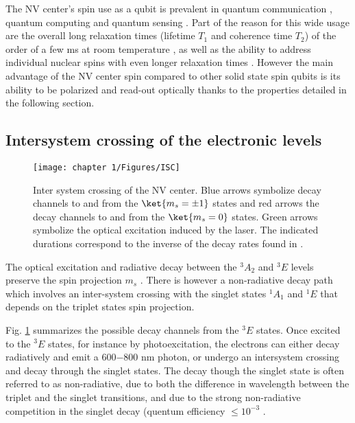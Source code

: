 \documentclass[a4paper, 11pt]{report}
\begin{document}
\bigskip
The NV center's spin use as a qubit is prevalent in quantum communication \citep{wehner2018quantum}, quantum computing \citep{de2021materials} and quantum sensing \citep{degen2017quantum}. Part of the reason for this wide usage are the overall long relaxation times (lifetime $T_1$ and coherence time $T_2$) of the order of a few ms at room temperature \citep{balasubramanian2009ultralong}, as well as the ability to address individual nuclear spins with even longer relaxation times \citep{awschalom2018quantum}. However the main advantage of the NV center spin compared to other solid state spin qubits is its ability to be polarized and read-out optically thanks to the properties detailed in the following section.


\subsection{Intersystem crossing of the electronic levels}
\label{sec ISC}
\begin{figure}[h!]
\centering
\texttt{[image: chapter 1/Figures/ISC]}
\caption{Inter system crossing of the NV center. Blue arrows symbolize decay channels to and from the $\ket{m_s=\pm 1}$ states and red arrows the decay channels to and from the $\ket{m_s=0}$ states. Green arrows symbolize the optical excitation induced by the laser. The indicated durations correspond to the inverse of the decay rates found in \citep{gupta2016efficient}.}
\label{ISC}
\end{figure}

The optical excitation and radiative decay between the $^3A_2$ and $^3E$ levels preserve the spin projection $m_s$ \citep{robledo2011spin}. There is however a non-radiative decay path which involves an inter-system crossing with the singlet states $^1A_1$ and $^1E$ that depends on the triplet states spin projection.

Fig. \ref{ISC} summarizes the possible decay channels from the $^3E$ states. Once excited to the $^3E$ states, for instance by photoexcitation, the electrons can either decay radiatively and emit a 600$-$800 nm photon, or undergo an intersystem crossing and decay through the singlet states. The decay though the singlet state is often referred to as non-radiative, due to both the difference in wavelength between the triplet and the singlet transitions, and due to the strong non-radiative competition in the singlet decay (quentum efficiency $\leq 10^{-3}$ \citep{rogers2008infrared, ma2010excited, acosta2010optical}.
\end{document}
